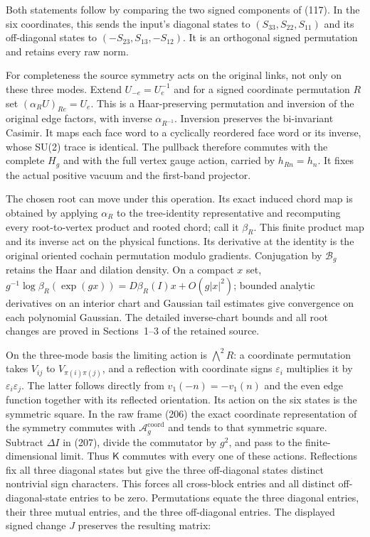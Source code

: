 Both statements follow by comparing the two signed components of (117).
In the six coordinates, this sends the input's diagonal states to
\((S_{33},S_{22},S_{11})\) and its off-diagonal states to
\((-S_{23},S_{13},-S_{12})\). It is an orthogonal signed permutation and
retains every raw norm.

For completeness the source symmetry acts on the original links, not
only on these three modes. Extend \(U_{-e}=U_e^{-1}\) and for a signed
coordinate permutation \(R\) set \((\alpha_RU)_{Re}=U_e\). This is a
Haar-preserving permutation and inversion of the original edge factors,
with inverse \(\alpha_{R^{-1}}\). Inversion preserves the bi-invariant
Casimir. It maps each face word to a cyclically reordered face word or
its inverse, whose SU(2) trace is identical. The pullback therefore
commutes with the complete \(H_g\) and with the full vertex gauge
action, carried by \(h_{Rn}=h_n\). It fixes the actual positive vacuum
and the first-band projector.

The chosen root can move under this operation. Its exact induced chord
map is obtained by applying \(\alpha_R\) to the tree-identity
representative and recomputing every root-to-vertex product and rooted
chord; call it \(\beta_R\). This finite product map and its inverse act
on the physical functions. Its derivative at the identity is the
original oriented cochain permutation modulo gradients. Conjugation by
\(\mathcal B_g\) retains the Haar and dilation density. On a compact
\(x\) set, \(g^{-1}\log\beta_R(\exp(gx))=D\beta_R(I)x+O(g|x|^2)\);
bounded analytic derivatives on an interior chart and Gaussian tail
estimates give convergence on each polynomial Gaussian. The detailed
inverse-chart bounds and all root changes are proved in Sections~1--3 of
the retained source.

On the three-mode basis the limiting action is \(\bigwedge^2R\): a
coordinate permutation takes \(V_{ij}\) to \(V_{\pi(i)\pi(j)}\), and a
reflection with coordinate signs \(\varepsilon_i\) multiplies it by
\(\varepsilon_i\varepsilon_j\). The latter follows directly from
\(v_1(-n)=-v_1(n)\) and the even edge function together with its
reflected orientation. Its action on the six states is the symmetric
square. In the raw frame (206) the exact coordinate representation of
the symmetry commutes with \(\mathcal A_g^{\mathrm{coord}}\) and tends
to that symmetric square. Subtract \(\Delta I\) in (207), divide the
commutator by \(g^2\), and pass to the finite-dimensional limit. Thus
\(\mathsf K\) commutes with every one of these actions. Reflections fix
all three diagonal states but give the three off-diagonal states
distinct nontrivial sign characters. This forces all cross-block entries
and all distinct off-diagonal-state entries to be zero. Permutations
equate the three diagonal entries, their three mutual entries, and the
three off-diagonal entries. The displayed signed change \(J\) preserves
the resulting matrix:

